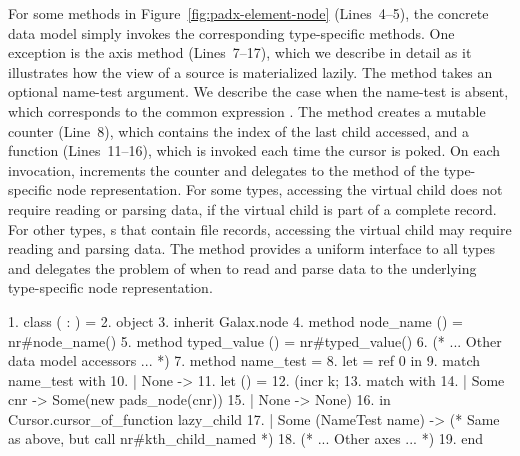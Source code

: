 For some methods in Figure~\ref{fig:padx-element-node} (Lines~4--5),
the concrete data model simply invokes the corresponding type-specific
methods.  One exception is the  axis method (Lines~7--17),
which we describe in detail as it illustrates how the \Xml{} view of a
\pads{} source is materialized lazily.
The  method takes an optional name-test argument.  We
describe the case when the name-test is absent, which corresponds to
the common expression .  The  method creates a
mutable counter  (Line~8), which contains the index of the
last child accessed, and a function  (Lines~11--16),
which is invoked each time the  cursor is poked.  On each
invocation,  increments the counter and delegates to
the  method of the type-specific node representation.
For some \pads{} types, accessing the virtual  child does not
require reading or parsing data, \eg{} if the virtual child is part of
a complete \pads{} record.  For other \pads{} types, \eg{} s that
contain file records, accessing the virtual  child may require
reading and parsing data.  The  method provides a
uniform interface to all types and delegates the problem of when to
read and parse data to the underlying type-specific node
representation.
\begin{figure*}
\begin{small}
\begin{code}
{ 1}. class  ( : ) =  
{ 2}. object 
{ 3}.   inherit Galax.node
{ 4}.   method node\_name   () = nr#node\_name()
{ 5}.   method typed\_value () = nr#typed_value() 
{ 6}.   (* ... Other data model accessors ... *)
{ 7}.   method  name\_test =  
{ 8}.     let  = ref 0 in
{ 9}.     match name\_test with 
{10}.     | None ->  
{11}.       let  () = 
{12}.        (incr k;
{13}.         match   with
{14}.         | Some cnr ->  Some(new pads\_node(cnr))
{15}.         | None -> None)
{16}.       in Cursor.cursor\_of\_function lazy\_child
{17}.     | Some (NameTest name) -> 
            (* Same as above, but call nr#kth\_child\_named *)
{18}.   (* ... Other axes ... *)
{19}. end
\end{code}
\end{small}
\caption{Fragment of the \padx{} concrete data model}
\label{fig:padx-element-node}
\end{figure*}

